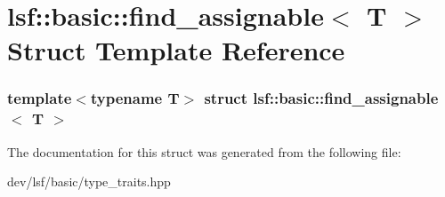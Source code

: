 \hypertarget{structlsf_1_1basic_1_1find__assignable_3_01T_01_4}{
\section{lsf::basic::find\_\-assignable$<$ T $>$ Struct Template Reference}
\label{structlsf_1_1basic_1_1find__assignable_3_01T_01_4}
}
\subsubsection*{template$<$typename T$>$ struct lsf::basic::find\_\-assignable$<$ T $>$}



The documentation for this struct was generated from the following file:\begin{DoxyCompactItemize}
\item 
dev/lsf/basic/type\_\-traits.hpp\end{DoxyCompactItemize}
